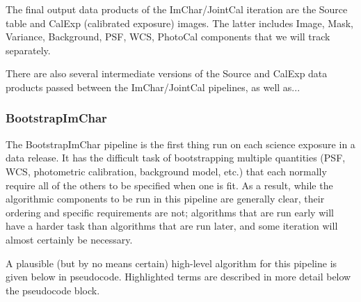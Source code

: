 The final output data products of the ImChar/JointCal iteration are the Source table and CalExp (calibrated exposure) images.  The latter includes Image, Mask, Variance, Background, PSF, WCS, PhotoCal components that we will track separately.

There are also several intermediate versions of the Source and CalExp data products passed between the ImChar/JointCal pipelines, as well as...

\subsubsection{BootstrapImChar}
\label{sec:drpBootstrapImChar}

The BootstrapImChar pipeline is the first thing run on each science exposure in a data release.  It has the difficult task of bootstrapping multiple quantities (PSF, WCS, photometric calibration, background model, etc.) that each normally require all of the others to be specified when one is fit.  As a result, while the algorithmic components to be run in this pipeline are generally clear, their ordering and specific requirements are not; algorithms that are run early will have a harder task than algorithms that are run later, and some iteration will almost certainly be necessary.

A plausible (but by no means certain) high-level algorithm for this pipeline is given below in pseudocode.  Highlighted terms are described in more detail below the pseudocode block.


\newcommand{\hr}[1]{\hyperref[sec:drpBootstrapImChar_#1]{#1}}

